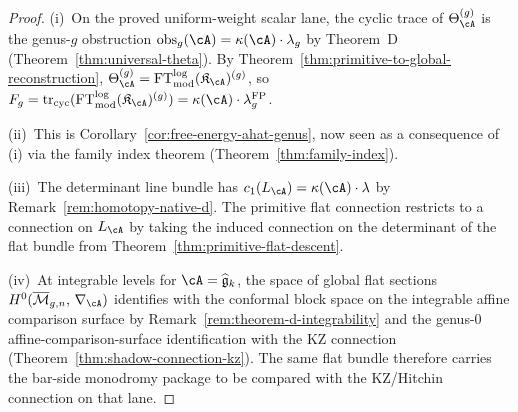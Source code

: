 \begin{proof}
(i)~On the proved uniform-weight scalar lane, the cyclic trace of
$\Theta_\cA^{(g)}$ is the genus-$g$ obstruction
$\operatorname{obs}_g(\cA) = \kappa(\cA) \cdot \lambda_g$ by
Theorem~D
(Theorem~\ref{thm:universal-theta}).  By
Theorem~\ref{thm:primitive-to-global-reconstruction},
$\Theta_\cA^{(g)} =
\operatorname{FT}^{\log}_{\mathrm{mod}}(\mathfrak{K}_\cA)^{(g)}$,
so $F_g = \operatorname{tr}_{\mathrm{cyc}}
(\operatorname{FT}^{\log}_{\mathrm{mod}}(\mathfrak{K}_\cA)^{(g)})
= \kappa(\cA) \cdot \lambda_g^{\mathrm{FP}}$.

(ii)~This is Corollary~\ref{cor:free-energy-ahat-genus},
now seen as a consequence of (i) via the family index theorem
(Theorem~\ref{thm:family-index}).

(iii)~The determinant line bundle has $c_1(L_\cA) = \kappa(\cA)
\cdot \lambda$ by Remark~\ref{rem:homotopy-native-d}.  The
primitive flat connection restricts to a connection on $L_\cA$
by taking the induced connection on the determinant of the
flat bundle from Theorem~\ref{thm:primitive-flat-descent}.

(iv)~At integrable levels for
$\cA = \widehat{\mathfrak{g}}_k$, the space of global flat
sections $H^0(\overline{\mathcal{M}}_{g,n},\, \nabla_\cA)$
identifies with the conformal block space on the integrable
affine comparison surface by
Remark~\ref{rem:theorem-d-integrability} and the
genus-$0$ affine-comparison-surface identification with the KZ
connection
(Theorem~\ref{thm:shadow-connection-kz}).  The same flat bundle
therefore carries the bar-side monodromy package to be compared
with the KZ/Hitchin connection on that lane.
\end{proof}

